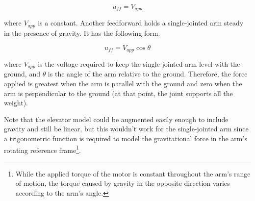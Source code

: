 \begin{equation}
  u_{ff} = V_{app}
\end{equation}

where $V_{app}$ is a constant. Another feedforward holds a single-jointed arm
steady in the presence of gravity. It has the following form.

\begin{equation}
  u_{ff} = V_{app} \cos\theta
\end{equation}

where $V_{app}$ is the voltage required to keep the single-jointed arm level
with the ground, and $\theta$ is the angle of the arm relative to the ground.
Therefore, the force applied is greatest when the arm is parallel with the
ground and zero when the arm is perpendicular to the ground (at that point, the
joint supports all the weight).

Note that the elevator model could be augmented easily enough to include gravity
and still be linear, but this wouldn't work for the single-jointed arm since a
trigonometric function is required to model the gravitational force in the arm's
rotating reference frame\footnote{While the applied torque of the motor is
constant throughout the arm's range of motion, the torque caused by gravity in
the opposite direction varies according to the arm's angle.}.
